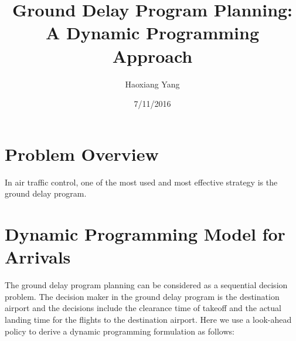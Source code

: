 \documentclass[12pt]{article}
\title{Ground Delay Program Planning: A Dynamic Programming Approach}
\author{Haoxiang Yang}
\date{7/11/2016}
\begin{document}
\maketitle

\section{Problem Overview}
	In air traffic control, one of the most used and most effective strategy is the ground delay program.
\section{Dynamic Programming Model for Arrivals}
	The ground delay program planning can be considered as a sequential decision problem. The decision maker in the ground delay program is the destination airport and the decisions include the clearance time of takeoff and the actual landing time for the flights to the destination airport. Here we use a look-ahead policy to derive a dynamic programming formulation as follows:\\
\end{document}
